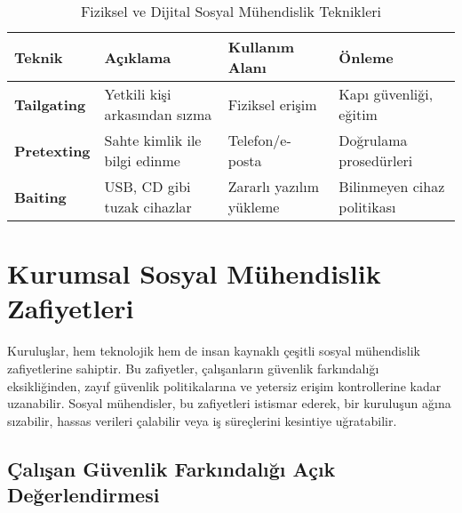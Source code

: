 \begin{longtable}{|>{\footnotesize}p{1.8cm}|>{\footnotesize}p{2.5cm}|>{\footnotesize}p{2cm}|>{\footnotesize}p{2.2cm}|}
    \caption{Fiziksel ve Dijital Sosyal Mühendislik Teknikleri} \\
    \hline
    \textbf{Teknik} & \textbf{Açıklama} & \textbf{Kullanım Alanı} & \textbf{Önleme} \\
    \hline
    \endhead
    \textbf{Tailgating} & Yetkili kişi arkasından sızma & Fiziksel erişim & Kapı güvenliği, eğitim \\
    \hline
    \textbf{Pretexting} & Sahte kimlik ile bilgi edinme & Telefon/e-posta & Doğrulama prosedürleri \\
    \hline
    \textbf{Baiting} & USB, CD gibi tuzak cihazlar & Zararlı yazılım yükleme & Bilinmeyen cihaz politikası \\
    \hline
\end{longtable}

\section{Kurumsal Sosyal Mühendislik Zafiyetleri}

Kuruluşlar, hem teknolojik hem de insan kaynaklı çeşitli sosyal mühendislik zafiyetlerine sahiptir. Bu zafiyetler, çalışanların güvenlik farkındalığı eksikliğinden, zayıf güvenlik politikalarına ve yetersiz erişim kontrollerine kadar uzanabilir. Sosyal mühendisler, bu zafiyetleri istismar ederek, bir kuruluşun ağına sızabilir, hassas verileri çalabilir veya iş süreçlerini kesintiye uğratabilir.

\subsection{Çalışan Güvenlik Farkındalığı Açık Değerlendirmesi}

